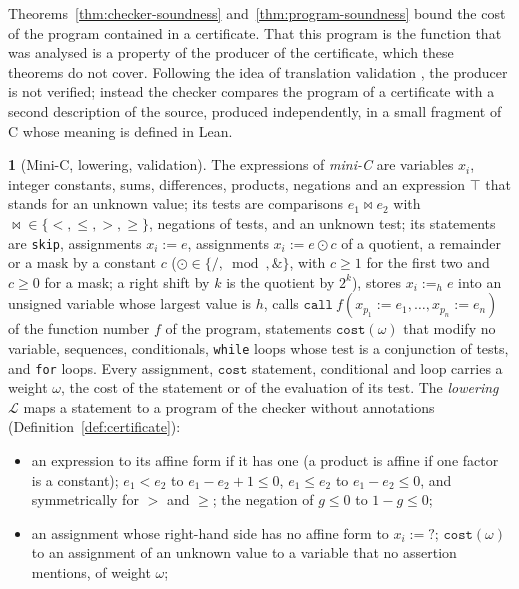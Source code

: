 \documentclass[oneside,english]{amsart}
\numberwithin{equation}{section}
\numberwithin{figure}{section}
\theoremstyle{plain}
\theoremstyle{definition}
\newtheorem{defn}[thm]{\protect\definitionname}
\theoremstyle{plain}
\theoremstyle{remark}
\theoremstyle{plain}
\theoremstyle{definition}
\theoremstyle{plain}
\theoremstyle{remark}
\providecommand{\definitionname}{Definition}
\begin{document}
Theorems~\ref{thm:checker-soundness} and~\ref{thm:program-soundness} bound the cost of the program contained in a certificate. That this program is the function that was analysed is a property of the producer of the certificate, which these theorems do not cover. Following the idea of translation validation \cite{pnueli1998translation,necula2000translation}, the producer is not verified; instead the checker compares the program of a certificate with a second description of the source, produced independently, in a small fragment of C whose meaning is defined in Lean.

\begin{defn}[Mini-C, lowering, validation]
\label{def:minic}
The expressions of \emph{mini-C} are variables $x_i$, integer constants, sums, differences, products, negations and an expression $\top$ that stands for an unknown value; its tests are comparisons $e_1 \bowtie e_2$ with ${\bowtie} \in \{<, \le, >, \ge\}$, negations of tests, and an unknown test; its statements are \texttt{skip}, assignments $x_i := e$, assignments $x_i := e \odot c$ of a quotient, a remainder or a mask by a constant $c$ (${\odot} \in \{/, \bmod, \mathbin{\&}\}$, with $c \ge 1$ for the first two and $c \ge 0$ for a mask; a right shift by $k$ is the quotient by $2^k$), stores $x_i :=_h e$ into an unsigned variable whose largest value is $h$, calls $\mathtt{call}\ f(x_{p_1} := e_1, \dots, x_{p_n} := e_n)$ of the function number $f$ of the program, statements $\mathtt{cost}(\omega)$ that modify no variable, sequences, conditionals, \texttt{while} loops whose test is a conjunction of tests, and \texttt{for} loops. Every assignment, $\mathtt{cost}$ statement, conditional and loop carries a weight $\omega$, the cost of the statement or of the evaluation of its test. The \emph{lowering} $\mathcal{L}$ maps a statement to a program of the checker without annotations (Definition~\ref{def:certificate}):
\begin{itemize}
    \item an expression to its affine form if it has one (a product is affine if one factor is a constant); $e_1 < e_2$ to $e_1 - e_2 + 1 \le 0$, $e_1 \le e_2$ to $e_1 - e_2 \le 0$, and symmetrically for $>$ and $\ge$; the negation of $g \le 0$ to $1 - g \le 0$;
    \item an assignment whose right-hand side has no affine form to $x_i := ?$; $\mathtt{cost}(\omega)$ to an assignment of an unknown value to a variable that no assertion mentions, of weight $\omega$;

\end{itemize}
\end{defn}
\end{document}
